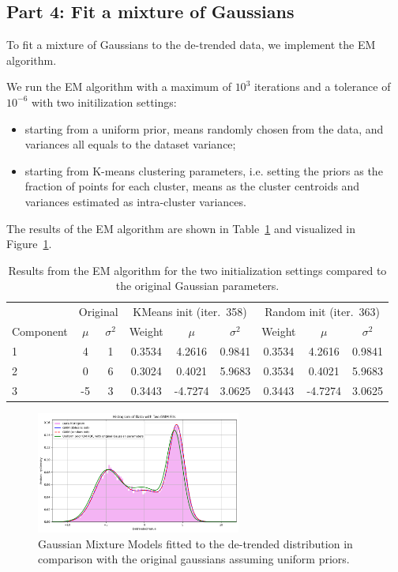 \documentclass[a4paper]{article}
\begin{document}
\subsection*{Part 4: Fit a mixture of Gaussians}

To fit a mixture of Gaussians to the de-trended data, we implement the EM algorithm.

We run the EM algorithm with a maximum of $10^3$ iterations and a tolerance of $10^{-6}$ with two initilization settings:
\begin{itemize}
    \setlength\itemsep{0.01em}
  \item starting from a uniform prior, means randomly chosen from the data, and variances all equals to the dataset variance;
  \item starting from K-means clustering parameters, i.e. setting the priors as the fraction of points for each cluster, means as the cluster centroids and variances estimated as intra-cluster variances.
\end{itemize}

The results of the EM algorithm are shown in Table~\ref{tab:gmm-results} and visualized in Figure~\ref{fig:gmm-plot}.

\begin{table}[htbp]
  \centering
  \small
  \begin{tabular}{l cc|ccc|ccc}
    \toprule
    & \multicolumn{2}{c}{Original} & \multicolumn{3}{c}{KMeans init (iter.\ 358)} & \multicolumn{3}{c}{Random init (iter.\ 363)} \\
    \cmidrule(lr){2-3} \cmidrule(lr){4-6} \cmidrule(lr){7-9}
    Component & $\mu$ & $\sigma^2$ & Weight & $\mu$ & $\sigma^2$ & Weight & $\mu$ & $\sigma^2$ \\
    \midrule
    1 & 4 & 1 & 0.3534 & 4.2616 & 0.9841 & 0.3534 & 4.2616 & 0.9841 \\
    2 &  0 & 6 & 0.3024 & 0.4021 & 5.9683 & 0.3534 & 0.4021 & 5.9683 \\
    3 &  -5 & 3 & 0.3443 & -4.7274 & 3.0625 & 0.3443 & -4.7274 & 3.0625 \\
    \bottomrule
  \end{tabular}
  \caption{
    Results from the EM algorithm for the two initialization settings compared to the original Gaussian parameters.
  }\label{tab:gmm-results}
\end{table}

\begin{figure}[htbp]
  \centering
  \includegraphics[width=0.6\textwidth]{images/gmm.png}\caption{
    Gaussian Mixture Models fitted to the de-trended distribution in comparison with the original gaussians assuming uniform priors.
  }\label{fig:gmm-plot}
\end{figure}
\end{document}
